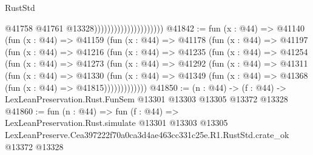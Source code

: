 \begin{lexlean}{RustStd}
\begin{coremodule}
                                              @41758
                                              @41761
                                              @13328)))))))))))))))))))))
@41842 := fun (x : @44) =>
  @41140
    (fun (x : @44) =>
    @41159
      (fun (x : @44) =>
      @41178
        (fun (x : @44) =>
        @41197
          (fun (x : @44) =>
          @41216
            (fun (x : @44) =>
            @41235
              (fun (x : @44) =>
              @41254
                (fun (x : @44) =>
                @41273
                  (fun (x : @44) =>
                  @41292
                    (fun (x : @44) =>
                    @41311
                      (fun (x : @44) =>
                      @41330
                        (fun (x : @44) =>
                        @41349 (fun (x : @44) => @41368 (fun (x : @44) => @41815)))))))))))))
@41850 := (n : @44) ->
  (f : @44) -> LexLeanPreservation.Rust.FunSem @13301 @13303 @13305 @13372 @13328
@41860 := fun (n : @44) =>
  fun (f : @44) =>
  LexLeanPreservation.Rust.simulate
    @13301
    @13303
    @13305
    LexLeanPreserve.Cea397222f70a0ca3d4ae463cc331c25e.R1.RustStd.crate_ok
    @13372
    @13328
\end{coremodule}
\end{lexlean}
